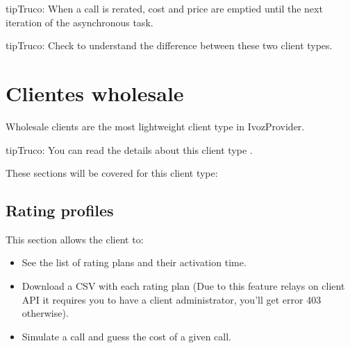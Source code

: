 \documentclass[letterpaper,10pt,spanish]{sphinxmanual}
\begin{document}
\begin{notice}{tip}{Truco:}
When a call is rerated, cost and price are emptied until the next iteration of the asynchronous task.
\end{notice}

\begin{notice}{tip}{Truco:}
Check {\hyperref[administration_portal/brand/clients/retail:differences\string-between\string-retail\string-and\string-residential\string-clients]{}} to understand the difference between these two
client types.
\end{notice}
\label{administration_portal/client/wholesale/index:wholesale-clients}

\section{Clientes wholesale}
\label{administration_portal/client/wholesale/index:clientes-wholesale}\label{administration_portal/client/wholesale/index:wholesale-clients}\label{administration_portal/client/wholesale/index::doc}\label{administration_portal/client/wholesale/index:id1}
Wholesale clients are the most lightweight client type in IvozProvider.

\begin{notice}{tip}{Truco:}
You can read the details about this client type {\hyperref[administration_portal/brand/clients/wholesale:wholesale\string-clients]{}}.
\end{notice}

These sections will be covered for this client type:


\subsection{Rating profiles}
\label{administration_portal/client/wholesale/rating_profiles:rating-profiles}\label{administration_portal/client/wholesale/rating_profiles::doc}
This section allows the client to:
\begin{itemize}
\item {} 
See the list of rating plans and their activation time.

\item {} 
Download a CSV with each rating plan (Due to this feature relays on client API it requires you to have a client administrator, you'll get error 403 otherwise).

\item {} 
Simulate a call and guess the cost of a given call.

\end{itemize}
\end{document}
